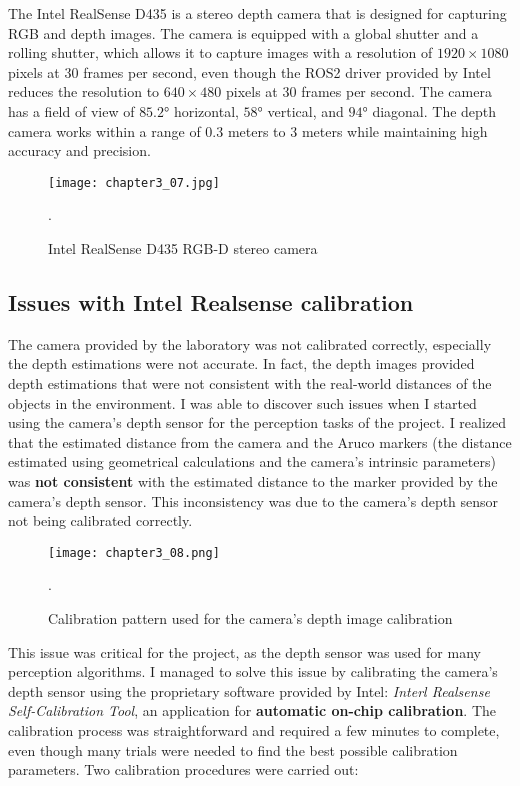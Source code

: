 The Intel RealSense D435 is a stereo depth camera that is designed for capturing RGB and depth images.
The camera is equipped with a global shutter and a rolling shutter, which allows it to capture images with a resolution
of $1920\times1080$ pixels at $30$ frames per second, even though the ROS2 driver provided by Intel reduces the resolution
to $640\times480$ pixels at $30$ frames per second. The camera has a field of view of $85.2$° horizontal, $58$° vertical,
and $94$° diagonal. The depth camera works within a range of $0.3$ meters to $3$ meters while maintaining 
high accuracy and precision.

\begin{figure}[t]
    \centering
    \texttt{[image: chapter3\_07.jpg]}
    \captionsetup{width=1\linewidth}
    \caption{Intel RealSense D435 RGB-D stereo camera}.
    \label{fig:c3_img07}
\end{figure}

\subsection{Issues with Intel Realsense calibration}

The camera provided by the laboratory was not calibrated correctly, especially the depth estimations were not accurate.
In fact, the depth images provided depth estimations that were not consistent with the real-world distances of the objects
in the environment. I was able to discover such issues when I started using the camera's depth sensor for the perception
tasks of the project. I realized that the estimated distance from the camera and the Aruco markers (the distance estimated
using geometrical calculations and the camera's intrinsic parameters) was \textbf{not consistent} with the estimated distance
to the marker provided by the camera's depth sensor. This inconsistency was due to the camera's depth sensor not being
calibrated correctly.

\begin{figure}[t]
    \centering
    \texttt{[image: chapter3\_08.png]}
    \captionsetup{width=1\linewidth}
    \caption{Calibration pattern used for the camera's depth image calibration}.
    \label{fig:c3_img08}
\end{figure}

This issue was critical for the project, as the depth sensor was used for many perception algorithms.
I managed to solve this issue by calibrating the camera's depth sensor using the proprietary software provided by Intel:
\textit{Interl Realsense Self-Calibration Tool}, an application for \textbf{automatic on-chip calibration}.
The calibration process was straightforward and required a few minutes to complete, even though many trials were needed
to find the best possible calibration parameters. Two calibration procedures were carried out:

